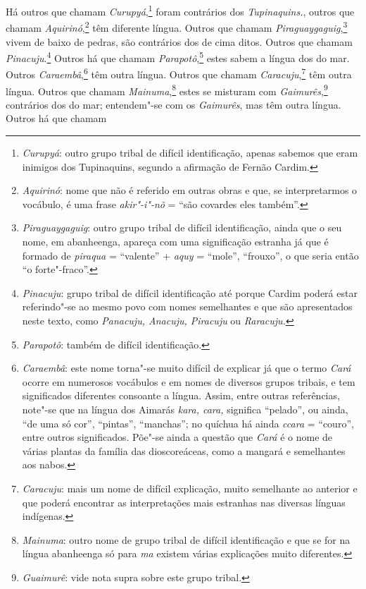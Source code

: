  Há outros que chamam \textit{Curupyá},\footnote{ \textit{Curupyá}: 
outro grupo tribal de difícil identificação, apenas sabemos que eram
inimigos dos Tupinaquins, segundo a afirmação de Fernão Cardim.}
foram contrários dos \textit{Tupinaquins.}, outros que chamam
\textit{Aquirinó},\footnote{ \textit{Aquirinó}: nome que não é
referido em outras obras e que, se interpretarmos o vocábulo, é uma frase
\textit{akir"-i"-nõ} = ``são covardes eles também''.} têm
diferente língua. Outros que chamam \textit{Piraguaygaguig},\footnote{ \textit{Piraguaygaguig}: outro grupo tribal de difícil identificação,
ainda que o seu nome, em abanheenga, apareça com uma significação
estranha já que é formado de \textit{piraqua} = ``valente'' +
\textit{aquy} = ``mole'', ``frouxo'', o que seria então ``o
forte"-fraco''.} vivem de baixo de pedras, são contrários dos de
cima ditos. Outros que chamam \textit{Pinacuju}.\footnote{ \textit{Pinacuju}: grupo tribal de difícil identificação até porque
Cardim poderá estar referindo"-se ao mesmo povo com nomes semelhantes e
que são apresentados neste texto, como \textit{Panacuju, Anacuju, 
Piracuju} ou \textit{Raracuju.}} Outros há que chamam
\textit{Parapotô},\footnote{ \textit{Parapotô}: também de difícil
identificação.} estes sabem a língua dos do mar. Outros
\textit{Caraembâ},\footnote{ \textit{Caraembâ}: este nome torna"-se
muito difícil de explicar já que o termo \textit{Cará} ocorre em
numerosos vocábulos e em nomes de diversos grupos tribais, e tem
significados diferentes consoante a língua. Assim, entre outras
referências, note"-se que na língua dos Aimarás \textit{kara, cara,} 
significa ``pelado'', ou ainda, ``de uma só cor'', ``pintas'', ``manchas''; no
quíchua há ainda \textit{ccara} = ``couro'', entre outros significados.
Põe"-se ainda a questão que \textit{Cará} é o nome de várias plantas da
família das dioscoreáceas, como a mangará e semelhantes aos nabos. }
têm outra língua. Outros que chamam 
\textit{Caracuju},\footnote{ \textit{Caracuju}: mais um nome de difícil explicação,
muito semelhante ao anterior e que poderá encontrar as interpretações
mais estranhas nas diversas línguas indígenas.} têm outra
língua. Outros que chamam \textit{Mainuma},\footnote{ \textit{Mainuma}: 
outro nome de grupo tribal de difícil identificação e que se for na
língua abanheenga só para \textit{ma} existem várias explicações muito
diferentes.} estes se misturam com \textit{Gaimurês},\footnote{ \textit{Guaimurê}: 
vide nota supra sobre este grupo tribal.} contrários dos do mar; entendem"-se 
com os \textit{Gaimurês}, mas têm outra língua. Outros há que chamam 
